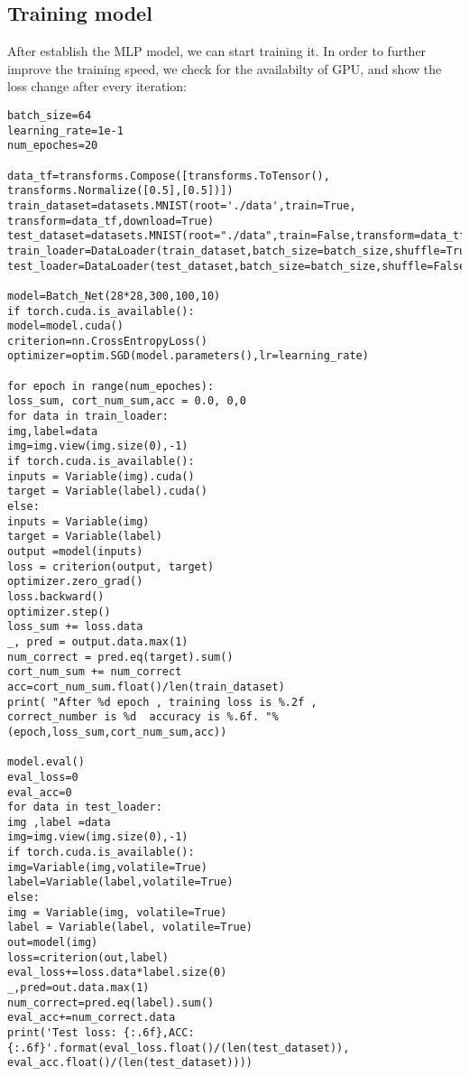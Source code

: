 \documentclass{article}
\begin{document}
\subsection{Training model}
After establish the MLP model, we can start training it. In order to further improve the training speed, we check for the availabilty of GPU, and show the loss change after every iteration:

\begin{verbatim}
batch_size=64
learning_rate=1e-1
num_epoches=20

data_tf=transforms.Compose([transforms.ToTensor(),
transforms.Normalize([0.5],[0.5])])
train_dataset=datasets.MNIST(root='./data',train=True,
transform=data_tf,download=True)
test_dataset=datasets.MNIST(root="./data",train=False,transform=data_tf)
train_loader=DataLoader(train_dataset,batch_size=batch_size,shuffle=True)
test_loader=DataLoader(test_dataset,batch_size=batch_size,shuffle=False)

model=Batch_Net(28*28,300,100,10)
if torch.cuda.is_available():
model=model.cuda()
criterion=nn.CrossEntropyLoss()
optimizer=optim.SGD(model.parameters(),lr=learning_rate)

for epoch in range(num_epoches):
loss_sum, cort_num_sum,acc = 0.0, 0,0
for data in train_loader:
img,label=data
img=img.view(img.size(0),-1)
if torch.cuda.is_available():
inputs = Variable(img).cuda()
target = Variable(label).cuda()
else:
inputs = Variable(img)
target = Variable(label)
output =model(inputs)
loss = criterion(output, target)
optimizer.zero_grad()
loss.backward()
optimizer.step()
loss_sum += loss.data
_, pred = output.data.max(1)
num_correct = pred.eq(target).sum()
cort_num_sum += num_correct
acc=cort_num_sum.float()/len(train_dataset)
print( "After %d epoch , training loss is %.2f , 
correct_number is %d  accuracy is %.6f. "%(epoch,loss_sum,cort_num_sum,acc))

model.eval()
eval_loss=0
eval_acc=0
for data in test_loader:
img ,label =data
img=img.view(img.size(0),-1)
if torch.cuda.is_available():
img=Variable(img,volatile=True)
label=Variable(label,volatile=True)
else:
img = Variable(img, volatile=True)
label = Variable(label, volatile=True)
out=model(img)
loss=criterion(out,label)
eval_loss+=loss.data*label.size(0)
_,pred=out.data.max(1)
num_correct=pred.eq(label).sum()
eval_acc+=num_correct.data
print('Test loss: {:.6f},ACC: {:.6f}'.format(eval_loss.float()/(len(test_dataset)),
eval_acc.float()/(len(test_dataset))))
\end{verbatim}
\end{document}
